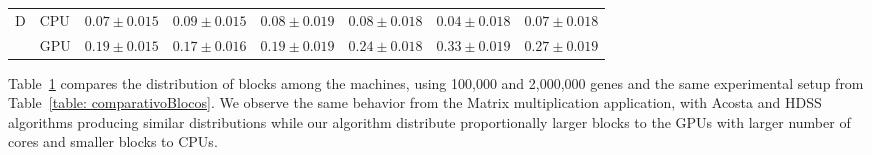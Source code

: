 \documentclass[journal]{IEEEtran}
\begin{document}
\begin{table}[htb]
\begin{scriptsize}
\begin{tabular}{|l|l|l|l|l|l|l|l|}
\hline
D & CPU & \multicolumn{1}{c|}{$0.07 \pm 0.015$} & \multicolumn{1}{c|}{$0.09 \pm 0.015$} & \multicolumn{1}{c|}{$0.08 \pm 0.019$} & \multicolumn{1}{c|}{$0.08 \pm 0.018$} & \multicolumn{1}{c|}{$0.04 \pm 0.018$} & \multicolumn{1}{c|}{$0.07 \pm 0.018$} \\ 
\cline{2-8}
 & GPU & \multicolumn{1}{c|}{$0.19 \pm 0.015$} & \multicolumn{1}{c|}{$0.17 \pm 0.016$} & \multicolumn{1}{c|}{$0.19 \pm 0.019$} & \multicolumn{1}{c|}{$0.24 \pm 0.018$} & \multicolumn{1}{c|}{$0.33 \pm 0.019$} & \multicolumn{1}{c|}{$0.27 \pm 0.019$} \\ 
\hline
\end{tabular}
\end{scriptsize}
\label{table: comparativoGene}
\end{table}

Table~\ref{table: comparativoGene} compares the distribution of blocks among the
machines, using 100,000 and 2,000,000 genes and the same experimental setup from
Table~\ref{table: comparativoBlocos}. We observe the same behavior from the
Matrix multiplication application, with Acosta and HDSS algorithms producing
similar distributions while our algorithm distribute proportionally larger
blocks to the GPUs with larger number of cores and smaller blocks to CPUs.
\end{document}
